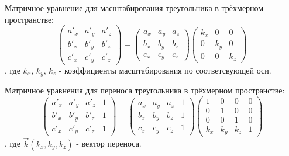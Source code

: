 \documentclass [12pt, a4paper] {article}
\begin{document}
Матричное уравнение для масштабирования треугольника в трёхмерном пространстве:
\begin {equation} \label {eq:scale2} \nonumber
	\begin {pmatrix}
		a'_x & a'_y & a'_z \\
		b'_x & b'_y & b'_z \\
		c'_x & c'_y & c'_z
	\end {pmatrix} = \begin {pmatrix}
		a_x & a_y & a_z \\
		b_x & b_y & b_z \\
		c_x & c_y & c_z
	\end {pmatrix} \begin {pmatrix}
		k_x & 0 & 0 \\
		0 & k_y & 0 \\
		0 & 0 & k_z
	\end {pmatrix}
\end {equation},
где $k_x$, $k_y$, $k_z$ - коэффициенты масштабирования по соответсвующей оси.

Матричное уравнения для переноса треугольника в трёхмерном пространстве:
\begin {equation} \label {eq:translation2} \nonumber
	\begin {pmatrix}
		a'_x & a'_y & a'_z & 1 \\
		b'_x & b'_y & b'_z & 1 \\
		c'_x & c'_y & c'_z & 1
	\end {pmatrix} = \begin {pmatrix}
		a_x & a_y & a_z & 1 \\
		b_x & b_y & b_z & 1 \\
		c_x & c_y & c_z & 1
	\end {pmatrix} \begin {pmatrix}
		1 & 0 & 0 & 0 \\
		0 & 1 & 0 & 0 \\
		0 & 0 & 1 & 0 \\
		k_x & k_y & k_z & 1
	\end {pmatrix}
\end {equation},
где $\overrightarrow{k}(k_x, k_y, k_z)$ - вектор переноса.
\end{document}
